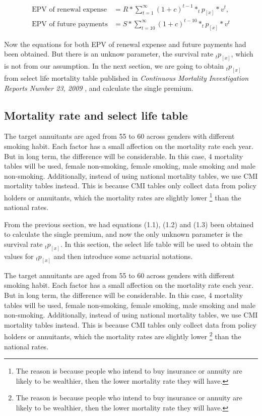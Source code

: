 \documentclass{report}
\begin{document}
\begin{align}
        \text{EPV of renewal expense}&= R  * \sum_{t=1}^{\infty}(1 + c )^{t-1} * _tp_{[x]}* v^t,\\
        \text{EPV of future payments}&= S * \sum_{t=10}^{\infty} (1 + c )^{t-10} * _tp_{[x]} * v^t
\end{align}


Now the equations for both EPV of renewal expense and future payments had been obtained. But there is an unknow parameter, the survival rate $_tp_{[x]}$, which is not from our assumption. In the next section, we are going to obtain $_tp_{[x]}$ from select life mortality table published in \textsl{Continuous Mortality Investigation Reports Number 23, 2009} \cite{bib:mortality-report}, and calculate the single premium.

\subsection{Mortality rate and select life table}

The target annuitants are aged from 55 to 60 across genders with different smoking habit. Each factor has a small affection on the mortality rate each year. But in long term, the difference will be considerable. In this case, 4 mortality tables will be used, female non-smoking, female smoking, male smoking and male non-smoking. Additionally, instead of using national mortality tables, we use CMI mortality tables instead. This is because CMI tables only collect data from policy holders or annuitants, which the mortality rates are slightly lower \footnote{The reason is because people who intend to buy insurance or annuity are likely to be wealthier, then the lower mortality rate they will have.} than the national rates.


From the previous section, we had equations (1.1), (1.2) and (1.3) been obtained to calculate the single premium, and now the only unknown parameter is the survival rate $_tp_{[x]}$. In this section, the select life table will be used to obtain the values for $_tp_{[x]}$ and then introduce some actuarial notations. 


The target annuitants are aged from 55 to 60 across genders with different smoking habit. Each factor has a small affection on the mortality rate each year. But in long term, the difference will be considerable. In this case, 4 mortality tables will be used, female non-smoking, female smoking, male smoking and male non-smoking. Additionally, instead of using national mortality tables, we use CMI mortality tables instead. This is because CMI tables only collect data from policy holders or annuitants, which the mortality rates are slightly lower \footnote{The reason is because people who intend to buy insurance or annuity are likely to be wealthier, then the lower mortality rate they will have.} than the national rates.
\end{document}
